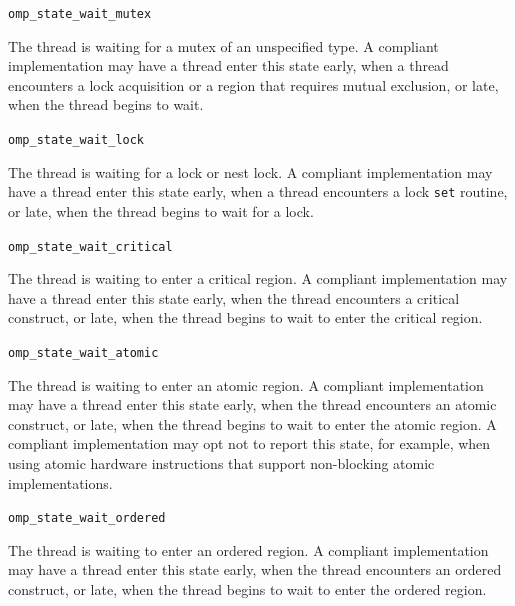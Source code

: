 \documentclass{article}
\newcommand{\descheader}[1]{{\needspace{3\baselineskip}\vspace{1em}\noindent \fbox{#1}}}
\begin{document}
\begin{description}

\item \verb|omp_state_wait_mutex|

  The thread is waiting for a mutex of an unspecified type. A compliant implementation
  may have a thread enter this state early, when a thread encounters a lock acquisition or a region that requires mutual exclusion, or late, when the thread begins to wait.

\item \verb|omp_state_wait_lock|

  The thread is waiting for a  lock  or nest lock. A compliant implementation
  may have a thread enter this state early, when a thread
  encounters a lock \verb|set| routine, or late, when the thread
  begins to wait for a lock.

\item \verb|omp_state_wait_critical| 

  The thread is waiting to enter a critical region. A compliant
  implementation may have a thread enter this state early, when the
  thread encounters a critical construct, or late, when the thread
  begins to wait to enter the critical region. 


\item \verb|omp_state_wait_atomic| 

  The thread is waiting to enter an atomic region. A compliant
  implementation may have a thread enter this state early, when the thread
  encounters an atomic construct, or late, when the thread begins
  to wait to enter the atomic region. 
  A compliant implementation may opt not to report
  this state, for example, when using atomic hardware instructions that support non-blocking atomic implementations.
  

\item \verb|omp_state_wait_ordered| 

  The thread is waiting to enter an ordered region. A compliant
  implementation may have a thread enter this state early, when the thread encounters
  an ordered construct, or late, when the thread begins
  to wait to enter the ordered region. 
  
\end{description}
  
\descheader{Target Wait States}
\end{document}
